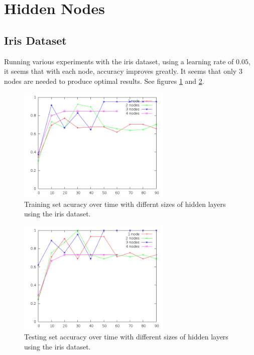 \documentclass[12pt]{article}
\begin{document}
\section{Hidden Nodes}
\subsection{Iris Dataset}
Running various experiments with the iris dataset, using a learning rate of
$0.05$, it seems that with each node,
accuracy improves greatly. It seems that only $3$ nodes are needed to produce
optimal results. See figures
\ref{fig:iris_hiddennodes_training} and \ref{fig:iris_hiddennodes_testing}.
\begin{figure}[!ht]
    \begin{center}
        \includegraphics[width=0.65\textwidth]{iris-hiddennodes-training}
    \end{center}
    \caption{Training set acuracy over time with differnt sizes of hidden layers using the iris dataset.}
  \label{fig:iris_hiddennodes_training}
\end{figure}

\begin{figure}[!ht]
    \begin{center}
        \includegraphics[width=0.65\textwidth]{iris-hiddennodes-testing}
    \end{center}
    \caption{Testing set accuracy over time with different sizes of hidden layers using the iris dataset.}
  \label{fig:iris_hiddennodes_testing}
\end{figure}
\end{document}
